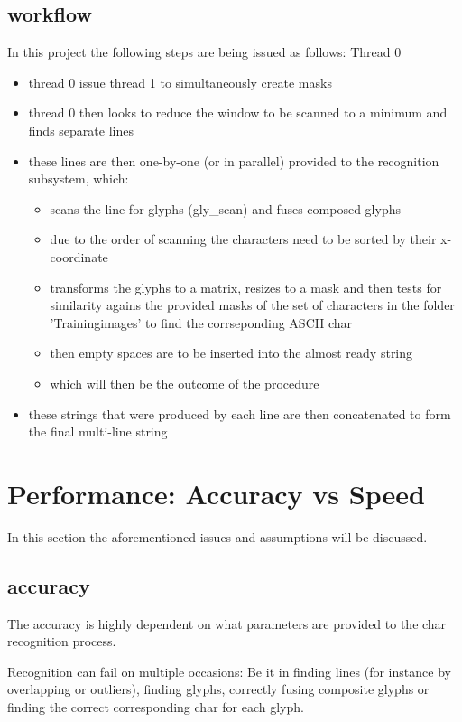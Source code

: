   \subsection{workflow}
In this project the following steps are being issued as follows:\newline
Thread 0
\begin{itemize}
\item thread 0
	\itemize issue thread 1 to simultaneously create masks
\item thread 0 then looks to reduce the window to be scanned to a minimum and finds separate lines
\item these lines are then one-by-one (or in parallel) provided to the recognition subsystem, which:
  \begin{itemize}
  \item scans the line for glyphs (gly_scan) and fuses composed glyphs
  \item due to the order of scanning the characters need to be sorted by their x-coordinate  
  \item transforms the glyphs to a matrix, resizes to a mask and then tests for similarity agains the provided masks of the set of characters in the folder 'Trainingimages' to find the corrseponding ASCII char  
  \item then empty spaces are to be inserted into the almost ready string
  \item which will then be the outcome of the procedure
  \end{itemize}
\item these strings that were produced by each line are then concatenated to form the final multi-line string
\end{itemize}

\section {Performance: Accuracy vs Speed}

In this section the aforementioned issues and assumptions will be discussed.

\subsection {accuracy}
The accuracy is highly dependent on what parameters are provided to the char recognition process.

Recognition can fail on multiple occasions: Be it in finding lines (for instance by overlapping or outliers), finding glyphs, correctly fusing composite glyphs or finding the correct corresponding char for each glyph.

